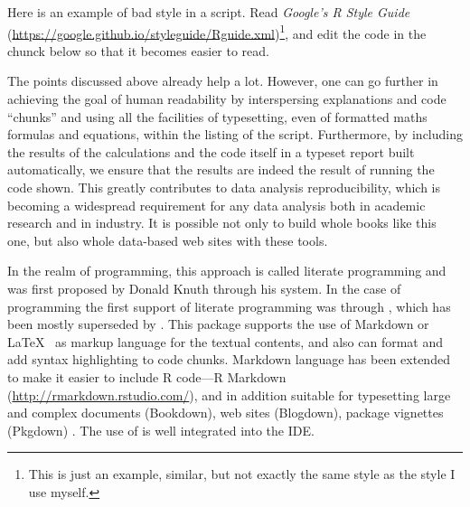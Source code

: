 \documentclass[krantz2]{krantz}\usepackage{knitr}%
\newcommand{\href}[2]{\emph{#2} (\url{#1})}
\begin{document}
\begin{playground}
Here is an example of bad style in a script. Read \href{https://google.github.io/styleguide/Rguide.xml}{Google's R Style Guide}\footnote{This is just an example, similar, but not exactly the same style as the style I use myself.}, and edit the code in the chunck below so that it becomes easier to read.

\begin{knitrout}\footnotesize
{}\color{fgcolor}\begin{kframe}
\begin{alltt}
 \hlkwb{<-}  
 \hlkwb{<-}  
 \hlkwb{<-}
     \hlopt{*}
 \hlkwb{->} 
      \hlstd{(}
\hlstd{)}
\end{alltt}
\end{kframe}
\end{knitrout}
\end{playground}

The points discussed above already help a lot. However, one can go further in achieving the goal of human readability by interspersing explanations and code ``chunks'' and using all the facilities of typesetting, even of formatted maths formulas and equations, within the listing of the script. Furthermore, by including the results of the calculations and the code itself in a typeset report built automatically, we ensure that the results are indeed the result of running the code shown. This greatly contributes to data analysis reproducibility, which is becoming a widespread requirement for any data analysis both in academic research and in industry. It is possible not only to build whole books like this one, but also whole data-based web sites with these tools.

In the realm of programming, this approach is called literate programming and was first proposed by Donald Knuth \autocite{Knuth1984a} through his  system. In the case of \Rpgrm programming the first support of literate programming was through , which has been mostly superseded by  \autocite{Xie2013}. This package supports the use of Markdown or \LaTeX\ \autocite{Lamport1994} as markup language for the textual contents, and also can format and add syntax highlighting to code chunks. Markdown language has been extended to make it easier to include R code---R Markdown (\url{http://rmarkdown.rstudio.com/}), and in addition suitable for typesetting large and complex documents (Bookdown), web sites (Blogdown), package vignettes (Pkgdown) \autocite{Xie2016,Xie2018}. The use of  is well integrated into the \RStudio IDE.
\end{document}
